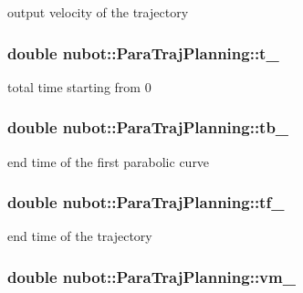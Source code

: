 output velocity of the trajectory 

\hypertarget{classnubot_1_1ParaTrajPlanning_af6272703f788bdb99fd53ff8d9ee1b2a}{
\subsubsection[{t\-\_\-}]{\setlength{\rightskip}{0pt plus 5cm}double nubot\-::\-Para\-Traj\-Planning\-::t\-\_\-\hspace{0.3cm}{\ttfamily [private]}}}\label{classnubot_1_1ParaTrajPlanning_af6272703f788bdb99fd53ff8d9ee1b2a}


total time starting from 0 

\hypertarget{classnubot_1_1ParaTrajPlanning_a2b81e7bb35fc05ad45084afcfe3a3b66}{
\subsubsection[{tb\-\_\-}]{\setlength{\rightskip}{0pt plus 5cm}double nubot\-::\-Para\-Traj\-Planning\-::tb\-\_\-\hspace{0.3cm}{\ttfamily [private]}}}\label{classnubot_1_1ParaTrajPlanning_a2b81e7bb35fc05ad45084afcfe3a3b66}


end time of the first parabolic curve 

\hypertarget{classnubot_1_1ParaTrajPlanning_a6f42b2fcaea2637f3bbe14fd6e50dff4}{
\subsubsection[{tf\-\_\-}]{\setlength{\rightskip}{0pt plus 5cm}double nubot\-::\-Para\-Traj\-Planning\-::tf\-\_\-\hspace{0.3cm}{\ttfamily [private]}}}\label{classnubot_1_1ParaTrajPlanning_a6f42b2fcaea2637f3bbe14fd6e50dff4}


end time of the trajectory 

\hypertarget{classnubot_1_1ParaTrajPlanning_a6e9c2b471fb2815ec3f285bdc2c8caf3}{
\subsubsection[{vm\-\_\-}]{\setlength{\rightskip}{0pt plus 5cm}double nubot\-::\-Para\-Traj\-Planning\-::vm\-\_\-\hspace{0.3cm}{\ttfamily [private]}}}\label{classnubot_1_1ParaTrajPlanning_a6e9c2b471fb2815ec3f285bdc2c8caf3}


